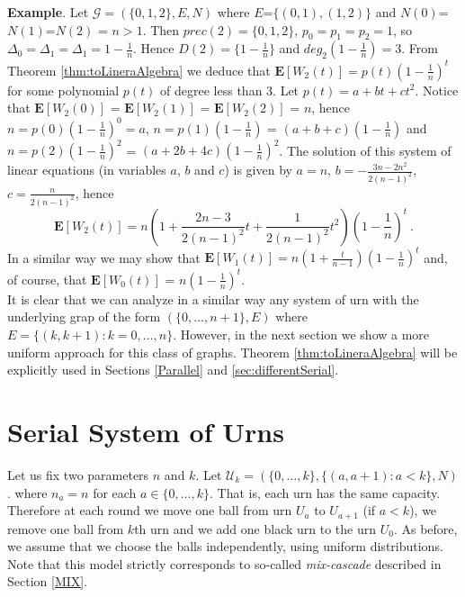 \documentclass[submission]{dmtcs}
\newcommand{\E}[1]{\mathbf{E}\left[#1\right]}
\begin{document}
\par
\textbf{Example}. Let $\mathcal{G}= (\{0,1,2\},E,N)$ where $E$=$\{(0,1),(1,2)\}$
and $N(0)$=$N(1)$=$N(2)$ = $n>1$. Then $prec(2) = \{0,1,2\}$, $p_0 = p_1 = p_2 = 1$, so
$\Delta_0 = \Delta_1 = \Delta_1 =1 - \frac1n$. Hence $D(2) = \{1-\frac1n\}$ and
$deg_2(1-\frac1n)=3$. 
From Theorem \ref{thm:toLineraAlgebra} we deduce that 
$\E{W_2(t)} = p(t) (1-\frac1n)^t$ for some polynomial $p(t)$ of degree less than $3$.
Let $p(t) = a + b t + ct^2$. Notice that $\E{W_2(0)}$ = $\E{W_2(1)}$ = $\E{W_2(2)}$ = $n$,
hence $ n = p(0)(1-\frac1n)^0 = a$, 
$n = p(1)(1-\frac1n)$ = $(a+b+c)(1-\frac1n)$ and
$n = p(2)(1-\frac1n)^2$ = $(a+2b+4c)(1-\frac1n)^2$.    
The solution of this system of linear equations (in variables $a$, $b$ and $c$) is given by 
$a =  n$, $b= -\frac{3 n-2 n^2}{2 (n-1)^2}$, $c= \frac{n}{2 (n-1)^2}$, hence
$$
  \E{W_2(t)} = n\left(1 + \frac{2n-3}{2(n-1)^2}t + \frac{1}{2 (n-1)^2} t^2\right)\left(1-\frac1n\right)^t~.
$$
In a similar way we may show that 
$\E{W_1(t)} = n \left(1 + \frac{t}{n-1}\right) \left(1-\frac{1}{n}\right)^t$
and, of course, that $\E{W_0(t)}$  = $n (1-\frac1n)^t$. \\

It is clear that we can analyze in a similar way any system of urn with the underlying grap of the
form $(\{0,\ldots,n+1\},E)$ where $E=\{(k,k+1): k=0,\ldots,n\}$. 
However, in the next section
we show a more uniform approach for this class of graphs. 
Theorem \ref{thm:toLineraAlgebra} will be explicitly used in Sections \ref{Parallel} and \ref{sec:differentSerial}. 




\section{Serial System of Urns}\label{Serial}

Let us fix two parameters $n$ and $k$.
Let $\mathcal{U}_k = (\{0,\ldots,k\},\{(a,a+1):a<k\},N)$.
where $n_a = n$ for each $a \in \{0,\ldots,k\}$. That is, each urn has the same capacity.
Therefore at each round we move one ball from urn $U_a$ to $U_{a+1}$ (if $a<k$), we remove
one ball from $k$th urn and we add one black urn to the urn $U_0$.
As before, we assume that we choose the balls independently, using uniform distributions.
Note that this model strictly corresponds to so-called \textit{mix-cascade} described in Section \ref{MIX}. 
\end{document}
